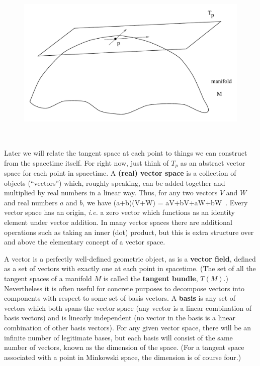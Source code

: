 \documentclass[12pt]{article}
\begin{document}
\begin{figure}[h]
  \centerline{
  \includegraphics[height=8cm]{pdf/one4}}
\end{figure}

Later we will relate the tangent space at each point to things we can
construct from the spacetime itself.  For right now, just think of $T_p$
as an abstract vector space for each point in spacetime.  A {\bf (real) vector 
space} is a collection of objects (``vectors'') which, roughly speaking, can 
be added together and multiplied by real numbers in a linear way.  Thus,
for any two vectors $V$ and $W$ and real numbers $a$ and $b$, we have
\be
  (a+b)(V+W) = aV+bV+aW+bW\ .\label{1.22}
\ee
Every vector space has an origin, {\it i.e.} a zero vector which functions
as an identity element under vector addition.  In many vector spaces there
are additional operations such as taking an inner (dot) product, but this
is extra structure over and above the elementary concept of a vector space.

A vector is a perfectly well-defined geometric object, as is a {\bf vector
field}, defined as a set of vectors with exactly one at each point in 
spacetime.  (The set of all the tangent spaces of a manifold $M$ is 
called the {\bf tangent bundle}, $T(M)$.)
Nevertheless it is often useful for concrete purposes to
decompose vectors into components with respect to some set of basis
vectors.  A {\bf basis} is any set of vectors which both spans the
vector space (any vector is a linear combination of basis vectors) and
is linearly independent (no vector in the basis is a linear combination of
other basis vectors).  For any given vector space, there will be an 
infinite number of legitimate bases, but each basis will consist of the
same number of vectors, known as the dimension of the space.  (For
a tangent space associated with a point in Minkowski space, the dimension
is of course four.)
\end{document}
